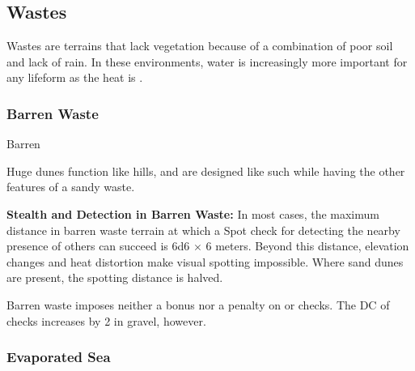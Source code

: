 \subsection{Wastes}
Wastes are terrains that lack vegetation because of a combination of poor soil and lack of rain. In these environments, water is increasingly more important for any lifeform as the heat is .

\subsubsection{Barren Waste}
Barren 

Huge dunes function like hills, and are designed like such while having the other features of a sandy waste.


\textbf{Stealth and Detection in Barren Waste:} In most cases, the maximum distance in barren waste terrain at which a Spot check for detecting the nearby presence of others can succeed is 6d6 $\times$ 6 meters. Beyond this distance, elevation changes and heat distortion make visual spotting impossible. Where sand dunes are present, the spotting distance is halved.

Barren waste imposes neither a bonus nor a penalty on  or  checks. The DC of  checks increases by 2 in gravel, however.


\subsubsection{Evaporated Sea}


